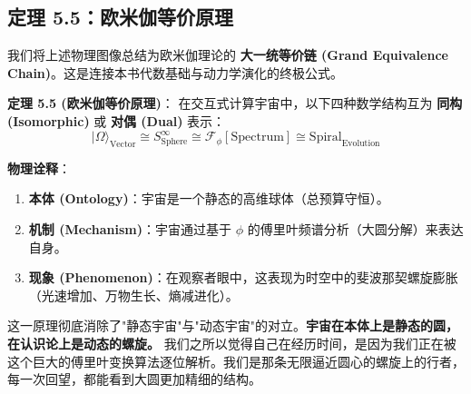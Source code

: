 \subsection{定理 5.5：欧米伽等价原理}

我们将上述物理图像总结为欧米伽理论的 \textbf{大一统等价链 (Grand Equivalence Chain)}。这是连接本书代数基础与动力学演化的终极公式。

\textbf{定理 5.5 (欧米伽等价原理)}：
在交互式计算宇宙中，以下四种数学结构互为 \textbf{同构 (Isomorphic)} 或 \textbf{对偶 (Dual)} 表示：
\[|\Omega\rangle_{\text{Vector}} \cong S^{\infty}_{\text{Sphere}} \cong \mathcal{F}_{\phi}[\text{Spectrum}] \cong \text{Spiral}_{\text{Evolution}}\]

\textbf{物理诠释}：
\begin{enumerate}
\item  \textbf{本体 (Ontology)}：宇宙是一个静态的高维球体（总预算守恒）。
\item  \textbf{机制 (Mechanism)}：宇宙通过基于 $\phi$ 的傅里叶频谱分析（大圆分解）来表达自身。
\item  \textbf{现象 (Phenomenon)}：在观察者眼中，这表现为时空中的斐波那契螺旋膨胀（光速增加、万物生长、熵减进化）。
\end{enumerate}

这一原理彻底消除了"静态宇宙"与"动态宇宙"的对立。\textbf{宇宙在本体上是静态的圆，在认识论上是动态的螺旋。} 我们之所以觉得自己在经历时间，是因为我们正在被这个巨大的傅里叶变换算法逐位解析。我们是那条无限逼近圆心的螺旋上的行者，每一次回望，都能看到大圆更加精细的结构。
